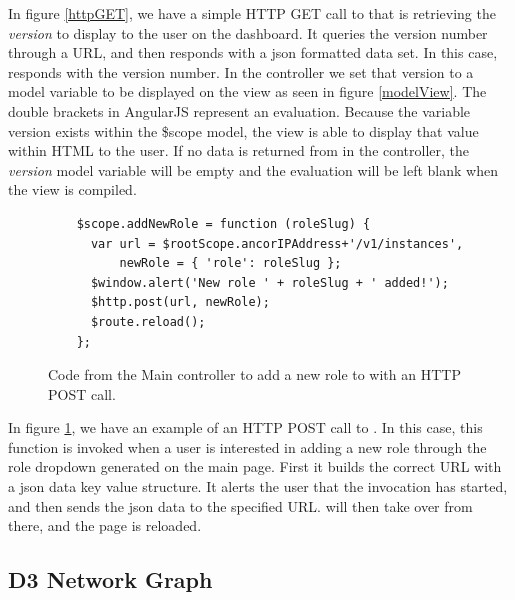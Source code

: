 In figure \ref{httpGET}, we have a simple HTTP GET call to \ancor{} that is retrieving the \emph{version} to display to the user on the dashboard. It queries the version number through a URL, and then \ancor{} responds with a json formatted data set. In this case, \ancor{} responds with the version number. In the controller we set that version to a model variable to be displayed on the view as seen in figure \ref{modelView}. The double brackets in AngularJS represent an evaluation. Because the variable version exists within the \$scope model, the view is able to display that value within HTML to the user. If no data is returned from \ancor{} in the controller,  the \emph{version} model variable will be empty and the evaluation will be left blank when the view is compiled.

\begin{figure}[H]
  \begin{center}
    \renewcommand{\theFancyVerbLine}{
      \sffamily\textcolor[rgb]{0.5,0.5,0.5}{\scriptsize\arabic{FancyVerbLine}}}
    \begin{verbatim}
    $scope.addNewRole = function (roleSlug) {
      var url = $rootScope.ancorIPAddress+'/v1/instances',
          newRole = { 'role': roleSlug };
      $window.alert('New role ' + roleSlug + ' added!');
      $http.post(url, newRole);
      $route.reload();
    };
    \end{verbatim}

  \end{center}
  \caption{Code from the Main controller to add a new role to \ancor{} with an HTTP POST call.}
  \label{httpPOST}
\end{figure}

In figure \ref{httpPOST}, we have an example of an HTTP POST call to \ancor{}. In this case, this function is invoked when a user is interested in adding a new role through the role dropdown generated on the main page. First it builds the correct URL with a json data key value structure. It alerts the user that the invocation has started, and then sends the json data to the specified URL. \ancor{} will then take over from there, and the page is reloaded.

\subsection{D3 Network Graph}

